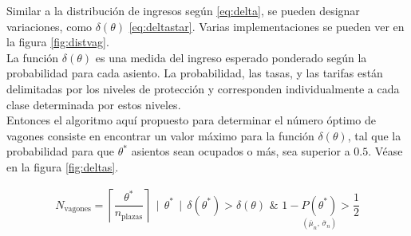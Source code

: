\documentclass[12pt]{article}
\begin{document}
Similar a la distribución de ingresos según \eqref{eq:delta}, se pueden designar variaciones, como $\delta(\theta)$ \eqref{eq:deltastar}. Varias implementaciones se pueden ver en la figura \nolinebreak \ref{fig:distvag}.\\

La función $\delta(\theta)$ es una medida del ingreso esperado ponderado según la probabilidad para cada asiento. La probabilidad, las tasas, y las tarifas están delimitadas por los niveles de protección y corresponden individualmente a cada clase determinada por estos niveles.\\

Entonces el algoritmo aquí propuesto para determinar el número óptimo de vagones consiste en encontrar un valor máximo para la función $\delta(\theta)$, tal que la probabilidad para que $\theta^*$ asientos sean ocupados o más, sea superior a $0.5$. Véase en la figura \ref{fig:deltas}.


\begin{align}
N_{\text{vagones}} = \left\lceil\dfrac{\theta^*}{n_{\text{plazas}}}\right\rceil \, \mid \, \theta^* \, \mid \, \delta(\theta^*) > \delta(\theta) \,\, \& \,\, 1 - \underset{(\overline{\mu}_n , \, \overline{\sigma}_n)}{P(\theta^*)} > \dfrac{1}{2}
\end{align}
\end{document}

